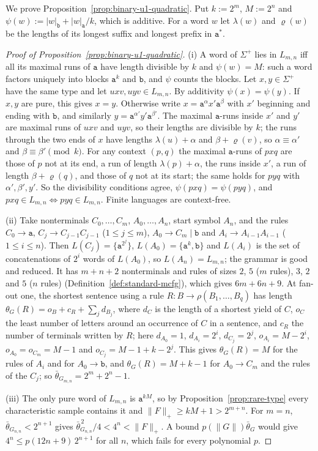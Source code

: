 We prove Proposition~\ref{prop:binary-u1-quadratic}.  Put
$k:=2^m$, $M:=2^n$ and $\psi(w):=|w|_{\mathtt b}+|w|_{\mathtt a}/k$, which is
additive.  For a word $w$ let $\lambda(w)$ and $\varrho(w)$ be the lengths of its
longest suffix and longest prefix in $\mathtt a^*$.

\begin{proof}[Proof of Proposition~\ref{prop:binary-u1-quadratic}]
(i) A word of $\Sigma^+$ lies in $L_{m,n}$ iff all its maximal runs of $\mathtt a$
have length divisible by $k$ and $\psi(w)=M$: such a word factors uniquely into
blocks $\mathtt a^k$ and $\mathtt b$, and $\psi$ counts the blocks.  Let
$x,y\in\Sigma^+$ have the same type and let $uxv,uyv\in L_{m,n}$.  By additivity
$\psi(x)=\psi(y)$.  If $x,y$ are pure, this gives $x=y$.  Otherwise write
$x=\mathtt a^{\alpha}x'\mathtt a^{\beta}$ with $x'$ beginning and ending with
$\mathtt b$, and similarly $y=\mathtt a^{\alpha'}y'\mathtt a^{\beta'}$.  The maximal
$\mathtt a$-runs inside $x'$ and $y'$ are maximal runs of $uxv$ and $uyv$, so their
lengths are divisible by $k$; the runs through the two ends of $x$ have lengths
$\lambda(u)+\alpha$ and $\beta+\varrho(v)$, so $\alpha\equiv\alpha'$ and
$\beta\equiv\beta'\pmod k$.  For any context $(p,q)$ the maximal $\mathtt a$-runs of
$pxq$ are those of $p$ not at its end, a run of length $\lambda(p)+\alpha$, the
runs inside $x'$, a run of length $\beta+\varrho(q)$, and those of $q$ not at its
start; the same holds for $pyq$ with $\alpha',\beta',y'$.  So the divisibility
conditions agree, $\psi(pxq)=\psi(pyq)$, and $pxq\in L_{m,n}\iff pyq\in L_{m,n}$.
Finite languages are context-free.

(ii) Take nonterminals $C_0,\ldots,C_m$, $A_0,\ldots,A_n$, start symbol $A_n$, and the
rules $C_0\to\mathtt a$, $C_j\to C_{j-1}C_{j-1}$ ($1\le j\le m$),
$A_0\to C_m\mid\mathtt b$ and $A_i\to A_{i-1}A_{i-1}$ ($1\le i\le n$).  Then
$L(C_j)=\{\mathtt a^{2^j}\}$, $L(A_0)=\{\mathtt a^k,\mathtt b\}$ and $L(A_i)$ is the
set of concatenations of $2^i$ words of $L(A_0)$, so $L(A_n)=L_{m,n}$; the grammar
is good and reduced.  It has $m+n+2$ nonterminals and rules of sizes $2$, $5$
($m$ rules), $3$, $2$ and $5$ ($n$ rules) (Definition~\ref{def:standard-mcfg}),
which gives $6m+6n+9$.  At fan-out one, the shortest sentence using a rule
$R:B\to\rho(B_1,\ldots,B_q)$ has length $\theta_G(R)=o_B+c_R+\sum_jd_{B_j}$, where
$d_C$ is the length of a shortest yield of $C$, $o_C$ the least number of letters
around an occurrence of $C$ in a sentence, and $c_R$ the number of terminals
written by $R$; here
$d_{A_0}=1$, $d_{A_i}=2^i$, $d_{C_j}=2^j$, $o_{A_i}=M-2^i$, $o_{A_0}=o_{C_m}=M-1$ and
$o_{C_j}=M-1+k-2^j$.  This gives $\theta_G(R)=M$ for the rules of $A_i$ and for
$A_0\to\mathtt b$, and $\theta_G(R)=M+k-1$ for $A_0\to C_m$ and the rules of the
$C_j$; so $\bar\theta_{G_{m,n}}=2^m+2^n-1$.

(iii) The only pure word of $L_{m,n}$ is $\mathtt a^{kM}$, so by
Proposition~\ref{prop:rare-type} every characteristic sample contains it and
$\|F\|_+\ge kM+1>2^{m+n}$.  For $m=n$, $\bar\theta_{G_{n,n}}<2^{n+1}$ gives
$\bar\theta_{G_{n,n}}^{\,2}/4<4^n<\|F\|_+$.  A bound $p(\|G\|)\bar\theta_G$ would give
$4^n\le p(12n+9)\,2^{n+1}$ for all $n$, which fails for every polynomial $p$.
\end{proof}


